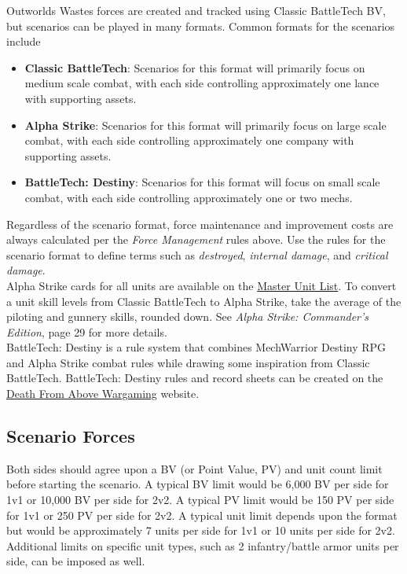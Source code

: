\documentclass{article}
\begin{document}
Outworlds Wastes forces are created and tracked using Classic BattleTech BV, but scenarios can be played in many formats.
Common formats for the scenarios include

\begin{itemize}

\item {\bf Classic BattleTech}: Scenarios for this format will primarily focus on medium scale combat, with each side controlling approximately one lance with supporting assets.

\item {\bf Alpha Strike}: Scenarios for this format will primarily focus on large scale combat, with each side controlling approximately one company with supporting assets.

\item {\bf BattleTech: Destiny}: Scenarios for this format will focus on small scale combat, with each side controlling approximately one or two mechs.

\end{itemize}

Regardless of the scenario format, force maintenance and improvement costs are always calculated per the \emph{Force Management} rules above.
Use the rules for the scenario format to define terms such as \emph{destroyed}, \emph{internal damage}, and \emph{critical damage}.\\

Alpha Strike cards for all units are available on the \href{http://www.masterunitlist.info}{Master Unit List}.
To convert a unit skill levels from Classic BattleTech to Alpha Strike, take the average of the piloting and gunnery skills, rounded down.
See \emph{Alpha Strike: Commander's Edition}, page 29 for more details.\\

BattleTech: Destiny is a rule system that combines MechWarrior Destiny RPG and Alpha Strike combat rules while drawing some inspiration from Classic BattleTech.
BattleTech: Destiny rules and record sheets can be created on the \href{https://dfawargaming.com}{Death From Above Wargaming} website.

\subsection{Scenario Forces}

Both sides should agree upon a BV (or Point Value, PV) and unit count limit before starting the scenario.
A typical BV limit would be 6,000 BV per side for 1v1 or 10,000 BV per side for 2v2.
A typical PV limit would be 150 PV per side for 1v1 or 250 PV per side for 2v2.
A typical unit limit depends upon the format but would be approximately 7 units per side for 1v1 or 10 units per side for 2v2.
Additional limits on specific unit types, such as 2 infantry/battle armor units per side, can be imposed as well.\\
\end{document}
